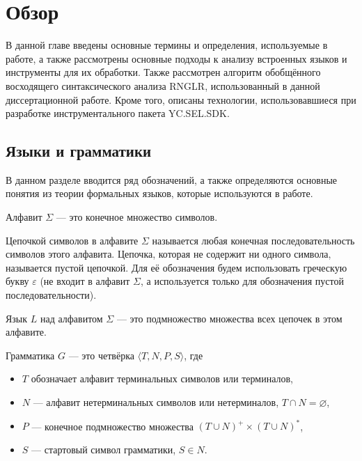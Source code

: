 \chapter{Обзор} \label{relWorks}

В данной главе введены основные термины и определения, используемые в работе, а также рассмотрены основные подходы к анализу встроенных языков и инструменты для их обработки. Также рассмотрен алгоритм обобщённого восходящего синтаксического анализа RNGLR, использованный в данной диссертационной работе. Кроме того, описаны технологии, использовавшиеся при разработке инструментального пакета YC.SEL.SDK.

\section{Языки и грамматики}

В данном разделе вводится ряд обозначений, а также определяются основные понятия из теории формальных языков, которые используются в работе.

\begin{mydef}
    Алфавит $\Sigma$ --- это конечное множество символов.
\end{mydef}

\begin{mydef}
    Цепочкой символов в алфавите $\Sigma$ называется любая конечная последовательность символов этого алфавита. Цепочка, которая не содержит ни одного символа, называется пустой цепочкой. Для её обозначения будем использовать греческую букву $\varepsilon$ (не входит в алфавит $\Sigma$, а используется только для обозначения пустой последовательности).
\end{mydef}

\begin{mydef}
    Язык $L$ над алфавитом $\Sigma$ --- это подмножество множества всех цепочек в этом алфавите.
\end{mydef}

\begin{mydef} 
    Грамматика $G$ --- это четвёрка $\langle T, N, P, S \rangle$, где 
    \begin{itemize}
        \item $T$ обозначает алфавит терминальных символов или терминалов, 
        \item $N$ --- алфавит нетерминальных символов или нетерминалов, $T \cap N=\varnothing$, 
        \item $P$ --- конечное подмножество множества $(T \cup N)^+ \times (T \cup N)^*$,  

        \item $S$ --- стартовый символ грамматики, $S  \in N$. 
    \end{itemize}
\end{mydef}

